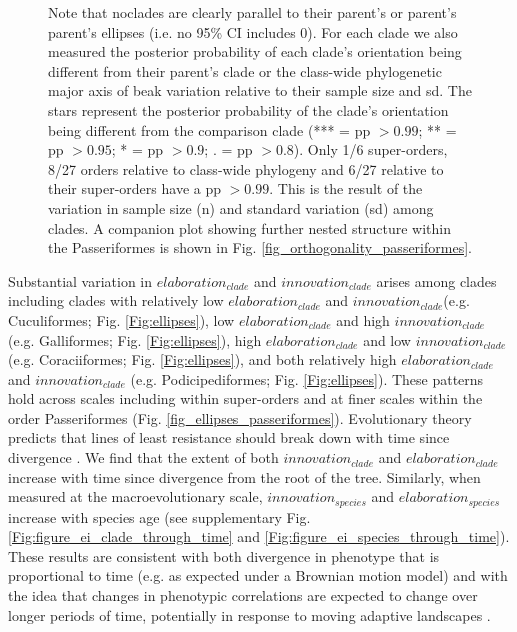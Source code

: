 \documentclass[12pt,letterpaper]{article}
\begin{document}
\begin{figure}[!htbp]
{{Note that noclades are clearly parallel to their parent’s or parent’s parent’s ellipses (i.e.
no 95\% CI includes 0).
For each clade we also measured the posterior probability of each clade's orientation being different from their parent's clade or the class-wide phylogenetic major axis of beak variation relative to their sample size and sd.
The stars represent the posterior probability of the clade's orientation being different from the comparison clade (*** = pp $> 0.99$; ** = pp $>0.95$; * = pp $> 0.9$; . = pp $> 0.8$).
Only 1/6 super-orders, 8/27 orders relative to class-wide phylogeny and 6/27 relative to their super-orders have a pp $> 0.99$.
This is the result of the variation in sample size (n) and standard variation (sd) among clades.
A companion plot showing further nested structure within the Passeriformes is shown in Fig. \ref{fig_orthogonality_passeriformes}.}}
\label{Fig:orthogonality}
\end{figure}
\bigskip



Substantial variation in $elaboration_{clade}$ and $innovation_{clade}$ arises among clades including clades with relatively low $elaboration_{clade}$ and $innovation_{clade}$(e.g. Cuculiformes; Fig. \ref{Fig:ellipses}), low $elaboration_{clade}$ and high $innovation_{clade}$ (e.g. Galliformes; Fig. \ref{Fig:ellipses}), high $elaboration_{clade}$ and low $innovation_{clade}$ (e.g. Coraciiformes; Fig. \ref{Fig:ellipses}), and both relatively high $elaboration_{clade}$ and $innovation_{clade}$ (e.g. Podicipediformes; Fig. \ref{Fig:ellipses}).
These patterns hold across scales including within super-orders and at finer scales within the order Passeriformes (Fig.
\ref{fig_ellipses_passeriformes}).
Evolutionary theory predicts that lines of least resistance should break down with time since divergence \cite{schluter1996adaptive, marroig2005size, mcglothlin2018adaptive}.
We find that the extent of both $innovation_{clade}$ and $elaboration_{clade}$ increase with time since divergence from the root of the tree.
Similarly, when measured at the macroevolutionary scale, $innovation_{species}$ and $elaboration_{species}$ increase with species age (see supplementary Fig. \ref{Fig:figure_ei_clade_through_time} and \ref{Fig:figure_ei_species_through_time}). %
These results are consistent with both divergence in phenotype that is proportional to time (e.g. as expected under a Brownian motion model) and with the idea that changes in phenotypic correlations are expected to change over longer periods of time, potentially in response to moving adaptive landscapes \cite{BurinWhales}.
\end{document}

